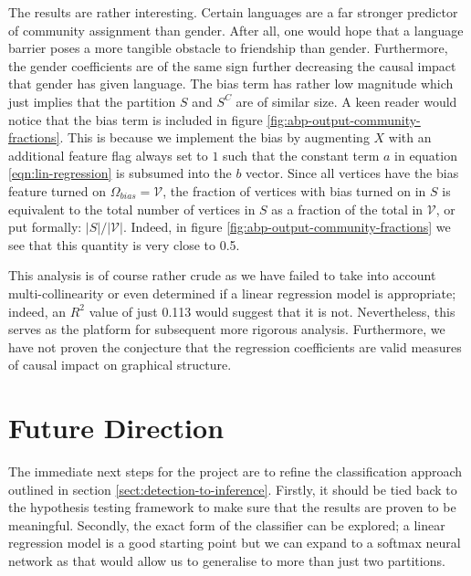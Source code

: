 \documentclass[11pt]{article}
\newcommand{\Vcal}{\mathcal{V}}
\begin{document}
\begin{multicols*}{2}
The results are rather interesting. Certain languages are a far stronger predictor of community assignment than gender. After all, one would hope that a language barrier poses a more tangible obstacle to friendship than gender. Furthermore, the gender coefficients are of the same sign further decreasing the causal impact that gender has given language. The bias term has rather low magnitude which just implies that the partition $S$ and $S^C$ are of similar size. A keen reader would notice that the bias term is included in figure \ref{fig:abp-output-community-fractions}. This is because we implement the bias by augmenting $X$ with an additional feature flag always set to $1$ such that the constant term $a$ in equation \ref{eqn:lin-regression} is subsumed into the $b$ vector. Since all vertices have the bias feature turned on $\Omega_{bias} = \Vcal$, the fraction of vertices with bias turned on in $S$ is equivalent to the total number of vertices in $S$ as a fraction of the total in $\Vcal$, or put formally: $|S| / |\Vcal|$. Indeed, in figure \ref{fig:abp-output-community-fractions} we see that this quantity is very close to 0.5.

This analysis is of course rather crude as we have failed to take into account multi-collinearity or even determined if a linear regression model is appropriate; indeed, an $R^2$ value of just 0.113 would suggest that it is not. Nevertheless, this serves as the platform for subsequent more rigorous analysis. Furthermore, we have not proven the conjecture that the regression coefficients are valid measures of causal impact on graphical structure.

\section{Future Direction}

The immediate next steps for the project are to refine the classification approach outlined in section \ref{sect:detection-to-inference}. Firstly, it should be tied back to the hypothesis testing framework to make sure that the results are proven to be meaningful. Secondly, the exact form of the classifier can be explored; a linear regression model is a good starting point but we can expand to a softmax neural network as that would allow us to generalise to more than just two partitions.


\end{multicols*}
\end{document}
